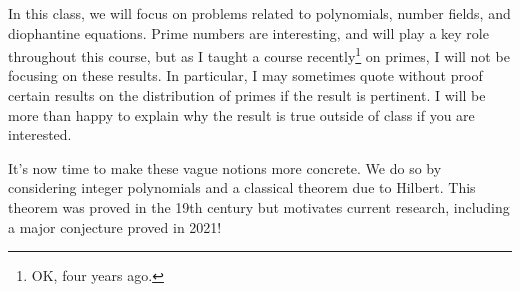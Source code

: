 \documentclass[12pt]{amsart}
\theoremstyle{definition} \newtheorem*{notation}{Notation}
\theoremstyle{remark} \newtheorem*{remark}{Remark}
\numberwithin{equation}{section}
\numberwithin{theorem}{section}
\begin{document}
	In this class, we will focus on problems related to polynomials, number fields, and diophantine equations.  Prime numbers are interesting, and will play a key role throughout this course, but as I taught a course recently\footnote{OK, four years ago.} on primes, I will not be focusing on these results.  In particular, I may sometimes quote without proof certain results on the distribution of primes if the result is pertinent.  I will be more than happy to explain why the result is true outside of class if you are interested.
	
	It's now time to make these vague notions more concrete.  We do so by considering integer polynomials and a classical theorem due to Hilbert.  This theorem was proved in the 19th century but motivates current research, including a major conjecture proved in 2021!
\end{document}
